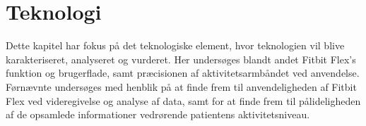\chapter{Teknologi}
Dette kapitel har fokus på det teknologiske element, hvor teknologien vil blive karakteriseret, analyseret og vurderet. Her undersøges blandt andet Fitbit Flex's funktion og brugerflade, samt præcisionen af aktivitetsarmbåndet ved anvendelse. Førnævnte undersøges med henblik på at finde frem til anvendeligheden af Fitbit Flex ved videregivelse og analyse af data, samt for at finde frem til pålideligheden af de opsamlede informationer vedrørende patientens aktivitetsniveau.









